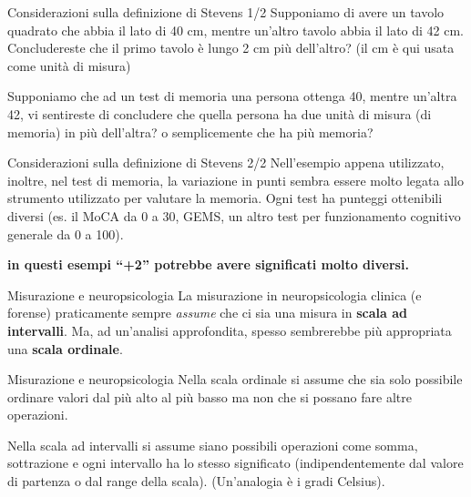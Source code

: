 \documentclass[
  ignorenonframetext,
]{beamer}
\begin{document}
\begin{frame}{Considerazioni sulla definizione di Stevens 1/2}
\label{considerazioni-sulla-definizione-di-stevens-12}
Supponiamo di avere un tavolo quadrato che abbia il lato di 40 cm,
mentre un'altro tavolo abbia il lato di 42 cm. Concludereste che il
primo tavolo è lungo 2 cm più dell'altro? (il cm è qui usata come unità
di misura) \pause

Supponiamo che ad un test di memoria una persona ottenga 40, mentre
un'altra 42, vi sentireste di concludere che quella persona ha due unità
di misura (di memoria) in più dell'altra? \pause o semplicemente che ha
più memoria?
\end{frame}

\begin{frame}{Considerazioni sulla definizione di Stevens 2/2}
\label{considerazioni-sulla-definizione-di-stevens-22}
Nell'esempio appena utilizzato, inoltre, nel test di memoria, la
variazione in punti sembra essere molto legata allo strumento utilizzato
per valutare la memoria. Ogni test ha punteggi ottenibili diversi (es.
il MoCA da 0 a 30, GEMS, un altro test per funzionamento cognitivo
generale da 0 a 100).

\pause

\textbf{in questi esempi ``+2'' potrebbe avere significati molto
diversi.}
\end{frame}

\begin{frame}{Misurazione e neuropsicologia}
\label{misurazione-e-neuropsicologia}
La misurazione in neuropsicologia clinica (e forense) praticamente
sempre \emph{assume} che ci sia una misura in \textbf{scala ad
intervalli}. Ma, ad un'analisi approfondita, spesso sembrerebbe più
appropriata una \textbf{scala ordinale}.
\end{frame}

\begin{frame}{Misurazione e neuropsicologia}
\label{misurazione-e-neuropsicologia-1}
Nella scala ordinale si assume che sia solo possibile ordinare valori
dal più alto al più basso ma non che si possano fare altre operazioni.

Nella scala ad intervalli si assume siano possibili operazioni come
somma, sottrazione e ogni intervallo ha lo stesso significato
(indipendentemente dal valore di partenza o dal range della scala).
(Un'analogia è i gradi Celsius).
\end{frame}
\end{document}
